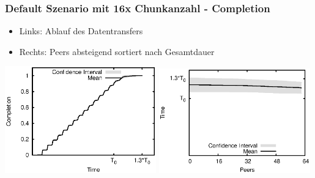 \begin{frame}
  \frametitle{Default Szenario mit 16x Chunkanzahl - Completion}
  \begin{itemize}  
    \item Links: Ablauf des Datentransfers
    \item Rechts: Peers absteigend sortiert nach Gesamtdauer
  \end{itemize}

  \begin{center}
    \includegraphics[width=0.49\textwidth]{fig/plots/scenario_17_chunk_count_fac_16/plots/GeneratedMeanChunkCompletion.csv.eps}
    \hfill
    \includegraphics[width=0.49\textwidth]{fig/plots/scenario_17_chunk_count_fac_16/plots/GeneratedMeanSortedChunkCompletion.csv.eps}
  \end{center}
\end{frame}


